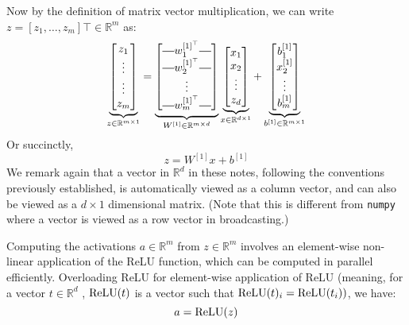 Now by the definition of matrix vector multiplication, we can write $z =
[z_1 ,\ldots,z_m ] \top \in \mathbb{R}^m$ as:
\begin{equation*}\label{eq:vectorized}
    \underbrace{\begin{bmatrix}
        z_1\\
        \vdots\\
        \vdots\\
        z_m
    \end{bmatrix}}_{z \in \mathbb R^{m \times 1}} = 
    \underbrace{\begin{bmatrix}
        \horzbar w^{[1]^\top}_1 \horzbar\\
        \horzbar w^{[1]^\top}_2 \horzbar\\
        \vdots\\
        \horzbar w^{[1]^\top}_m \horzbar
    \end{bmatrix}}_{W^{[1]} \in \mathbb{R}^{m \times d}}
    \underbrace{\begin{bmatrix}
        x_1\\
        x_2\\
        \vdots\\
        z_d
    \end{bmatrix}}_{x \in \mathbb R^{d \times 1}} + 
    \underbrace{\begin{bmatrix}
        b_1^{[1]}\\
        x_2^{[1]}\\
        \vdots\\
        b_m^{[1]}
    \end{bmatrix}}_{b^{[1]} \in \mathbb R^{m \times 1}}
\end{equation*}
Or succinctly,
\begin{equation}
    z = W^{[1]} x + b^{[1]}
\end{equation}
We remark again that a vector in $\mathbb R^d$ in these notes, following the conventions %
previously established, is automatically viewed as a column vector, and can
also be viewed as a $d \times 1$ dimensional matrix. (Note that this is different
from \texttt{numpy} where a vector is viewed as a row vector in broadcasting.)

Computing the activations $a \in \mathbb{R}^m$ from $z \in \mathbb{R}^m$ involves an element-wise
non-linear application of the ReLU function, which can be computed in
parallel efficiently. Overloading ReLU for element-wise application of ReLU
(meaning, for a vector $t \in \mathbb{R}^d$ , $\operatorname{ReLU}(t)$ is a vector such that $\operatorname{ReLU}(t)_i =
\operatorname{ReLU}(t_i))$, we have:
\begin{equation}
    a = \operatorname{ReLU}(z)
\end{equation}

